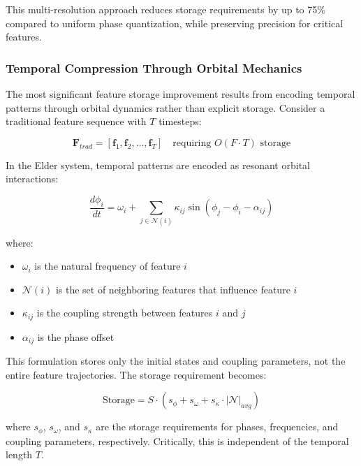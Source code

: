 This multi-resolution approach reduces storage requirements by up to 75\% compared to uniform phase quantization, while preserving precision for critical features.

\subsubsection{Temporal Compression Through Orbital Mechanics}

The most significant feature storage improvement results from encoding temporal patterns through orbital dynamics rather than explicit storage. Consider a traditional feature sequence with $T$ timesteps:

\begin{equation}
\mathbf{F}_{trad} = [\mathbf{f}_1, \mathbf{f}_2, \ldots, \mathbf{f}_T] \quad \text{requiring } O(F \cdot T) \text{ storage}
\end{equation}

In the Elder system, temporal patterns are encoded as resonant orbital interactions:

\begin{equation}
\frac{d\phi_i}{dt} = \omega_i + \sum_{j \in \mathcal{N}(i)} \kappa_{ij} \sin(\phi_j - \phi_i - \alpha_{ij})
\end{equation}

where:
\begin{itemize}
    \item $\omega_i$ is the natural frequency of feature $i$
    \item $\mathcal{N}(i)$ is the set of neighboring features that influence feature $i$
    \item $\kappa_{ij}$ is the coupling strength between features $i$ and $j$
    \item $\alpha_{ij}$ is the phase offset
\end{itemize}

This formulation stores only the initial states and coupling parameters, not the entire feature trajectories. The storage requirement becomes:

\begin{equation}
\text{Storage} = S \cdot (s_\phi + s_\omega + s_\kappa \cdot |\mathcal{N}|_{avg})
\end{equation}

where $s_\phi$, $s_\omega$, and $s_\kappa$ are the storage requirements for phases, frequencies, and coupling parameters, respectively. Critically, this is independent of the temporal length $T$.


